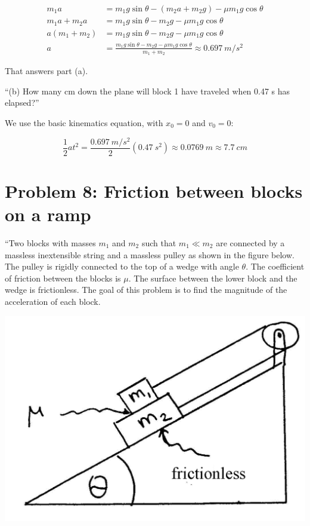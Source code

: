 \documentclass[8.01x]{subfiles}
\begin{document}
\begin{align}
m_1 a &= m_1 g \sin \theta - (m_2 a + m_2 g) - \mu m_1 g \cos \theta\\
m_1 a + m_2 a &= m_1 g \sin \theta - m_2 g - \mu m_1 g \cos \theta\\
a(m_1 + m_2) &= m_1 g \sin \theta - m_2 g - \mu m_1 g \cos \theta\\
a &= \frac{m_1 g \sin \theta - m_2 g - \mu m_1 g \cos \theta}{m_1 + m_2} \approx \SI{0.697}{m/s^2}
\end{align}

That answers part (a).

``(b) How many cm down the plane will block 1 have traveled when 0.47 s has elapsed?''

We use the basic kinematics equation, with $x_0 = 0$ and $v_0 = 0$:

\begin{equation}
\frac{1}{2} a t^2 = \frac{\SI{0.697}{m/s^2}}{2} (\SI{0.47}{s^2}) \approx \SI{0.0769}{m} \approx \SI{7.7}{cm}
\end{equation}

\section{Problem 8: Friction between blocks on a ramp}

``Two blocks with masses $m_1$ and $m_2$ such that $m_1 \ll m_2$ are connected by a massless inextensible string and a massless pulley as shown in the figure below. The pulley is rigidly connected to the top of a wedge with angle $\theta$. The coefficient of friction between the blocks is $\mu$. The surface between the lower block and the wedge is frictionless. The goal of this problem is to find the magnitude of the acceleration of each block.

\begin{center}
\includegraphics[scale=1.0]{Graphics/h3p8}
\end{center}
\end{document}
